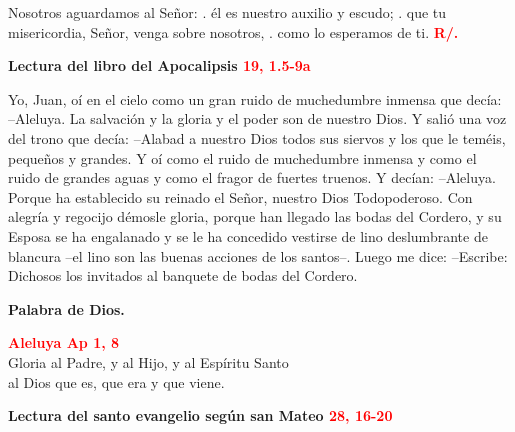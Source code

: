 \documentclass[12pt, letterpaper, spanish]{report}
\begin{document}
\hspace{2cm} Nosotros aguardamos al Se\~nor: \newline
. \hspace{2.5cm}  \'el es nuestro auxilio y escudo; \newline
. \hspace{2.5cm}  que tu misericordia, Se\~nor, venga sobre nosotros, \newline
. \hspace{2.5cm}  como lo esperamos de ti. \hspace{1cm} {\bfseries \textcolor{red}{R/.}} \newline

\Large {\bfseries Lectura del libro del Apocalipsis \hspace{1cm} \textcolor{red}{19, 1.5-9a}} \newline 

\Large Yo, Juan, o\'i en el cielo como un gran ruido de muchedumbre inmensa que dec\'ia: --Aleluya. 
La salvaci\'on y la gloria y el poder son de nuestro Dios. Y sali\'o una voz del trono que dec\'ia: 
--Alabad a nuestro Dios todos sus siervos y los que le tem\'eis, peque\~nos y grandes. Y o\'i como 
el ruido de muchedumbre inmensa y como el ruido de grandes aguas y como el fragor de fuertes 
truenos. Y dec\'ian: --Aleluya. Porque ha establecido su reinado el Se\~nor, nuestro Dios 
Todopoderoso. Con alegr\'ia y regocijo d\'emosle gloria, porque han llegado las bodas del Cordero, 
y su Esposa se ha engalanado y se le ha concedido vestirse de lino deslumbrante de blancura --el 
lino son las buenas acciones de los santos--. Luego me dice: --Escribe: Dichosos los invitados al 
banquete de bodas del Cordero. \newline

{\bfseries Palabra de Dios.} \newline

\begin{center} 
\Large {\bfseries \textcolor{red}{Aleluya \hspace{1cm} Ap 1, 8}} \\
Gloria al Padre, y al Hijo, y al Esp\'iritu Santo \\
al Dios que es, que era y que viene.
\end{center}

\Huge \textcolor{red}{} \Large {\bfseries Lectura del santo evangelio seg\'un san Mateo \hspace{1cm} \textcolor{red}{28, 16-20}} \newline
\end{document}
